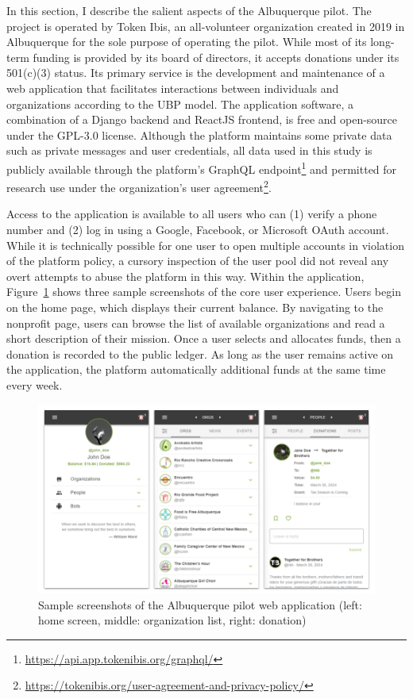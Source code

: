 In this section, I describe the salient aspects of the Albuquerque pilot.
The project is operated by Token Ibis, an all-volunteer organization created in 2019 in Albuquerque for the sole purpose of operating the pilot.
While most of its long-term funding is provided by its board of directors, it accepts donations under its 501(c)(3) status.
Its primary service is the development and maintenance of a web application that facilitates interactions between individuals and organizations according to the UBP model.
The application software, a combination of a Django backend and ReactJS frontend, is free and open-source under the GPL-3.0 license.
Although the platform maintains some private data such as private messages and user credentials, all data used in this study is publicly available through the platform's GraphQL endpoint\footnote{\url{https://api.app.tokenibis.org/graphql/}} and permitted for research use under the organization's user agreement\footnote{\url{https://tokenibis.org/user-agreement-and-privacy-policy/}}.

Access to the application is available to all users who can (1) verify a phone number and (2) log in using a Google, Facebook, or Microsoft OAuth account.
While it is technically possible for one user to open multiple accounts in violation of the platform policy, a cursory inspection of the user pool did not reveal any overt attempts to abuse the platform in this way.
Within the application, Figure~\ref{fig:application} shows three sample screenshots of the core user experience.
Users begin on the home page, which displays their current balance.
By navigating to the nonprofit page, users can browse the list of available organizations and read a short description of their mission.
Once a user selects and allocates funds, then a donation is recorded to the public ledger.
As long as the user remains active on the application, the platform automatically additional funds at the same time every week.

\begin{figure}[H]
  \centering
  \includegraphics[width=\linewidth]{figures/application}
  \caption{Sample screenshots of the Albuquerque pilot web application (left: home screen, middle: organization list, right: donation)}
  \label{fig:application}
\end{figure}

